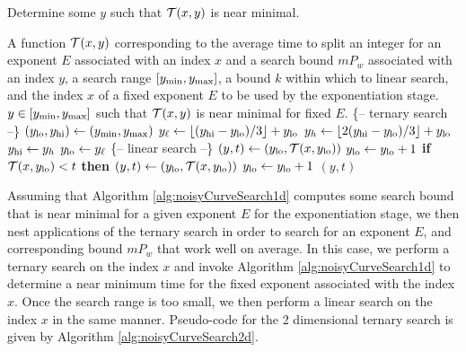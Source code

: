 \documentclass{ucalgthes1}
\theoremstyle{definition}
\newcommand{\floor}[1]{\left\lfloor #1 \right\rfloor}
\begin{document}
\begin{algorithm}[htb]
\caption[Subroutine to Search a Curve in 1 Dimension.]{Determine some $y$ such that $\mathcal T(x, y)$ is near minimal.}
\label{alg:noisyCurveSearch1d}
\begin{algorithmic}[1]
\Require A function $\mathcal T(x, y)$ corresponding to the average time to split an integer for an exponent $E$ associated with an index $x$ and a search bound $mP_w$ associated with an index $y$,
a search range $[y_{\textrm{min}}, y_{\textrm{max}}]$,
a bound $k$ within which to linear search,
and the index $x$ of a fixed exponent $E$ to be used by the exponentiation stage.
\Ensure $y \in [y_{\textrm{min}}, y_{\textrm{max}}]$ such that $\mathcal T(x, y)$ is near minimal for fixed $E$.
\Statex \{-- ternary search --\}
\State $(y_{\textrm{lo}}, y_{\textrm{hi}}) \gets (y_{\textrm{min}}, y_{\textrm{max}})$
	\State $\yonethird \gets \floor{(\yhi - \ylo) / 3} + \ylo$
	\State $\ytwothird \gets \floor{2(\yhi - \ylo) / 3} + \ylo$
		\State $y_{\textrm{hi}} \gets y_h$
	\Else
		\State $y_{\textrm{lo}} \gets y_\ell$
	\EndIf
\EndWhile
\Statex \{-- linear search --\}
\State $(y, t) \gets (y_{\textrm{lo}}, \mathcal T(x, y_{\textrm{lo}}))$ 
\State $y_{\textrm{lo}} \gets y_{\textrm{lo}} + 1$
\While{$\ylo \le \yhi$}
	\State \textbf{if} $\mathcal T(x, y_{\textrm{lo}}) < t$ \textbf{then} $(y, t) \gets (y_{\textrm{lo}}, \mathcal T(x, y_{\textrm{lo}}))$
	\State $y_{\textrm{lo}} \gets y_{\textrm{lo}} + 1$
\EndWhile
\State \Return $(y, t)$
\EndProcedure
\end{algorithmic}
\end{algorithm}

Assuming that Algorithm \ref{alg:noisyCurveSearch1d} computes some search bound that is near minimal for a given exponent $E$ for the exponentiation stage, we then nest applications of the ternary search in order to search for an exponent $E$, and corresponding bound $mP_w$ that work well on average.  In this case, we perform a ternary search on the index $x$ and invoke Algorithm \ref{alg:noisyCurveSearch1d} to determine a near minimum time for the fixed exponent associated with the index $x$.  Once the search range is too small, we then perform a linear search on the index $x$ in the same manner.  Pseudo-code for the 2 dimensional ternary search is given by Algorithm \ref{alg:noisyCurveSearch2d}.
\end{document}
